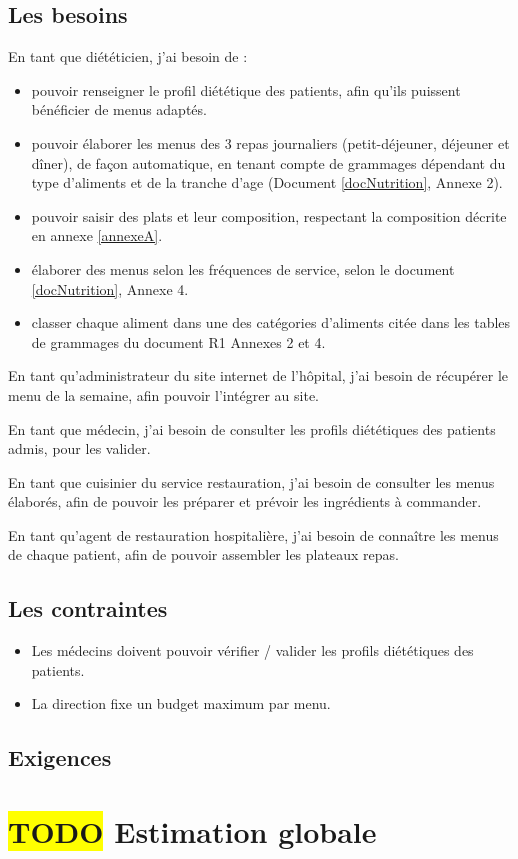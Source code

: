 \subsection{Les besoins}
En tant que diététicien, j’ai besoin de :
\begin{itemize}
 \item pouvoir renseigner le profil diététique des patients, afin qu’ils puissent bénéficier de menus adaptés.
 \item pouvoir élaborer les menus des 3 repas journaliers (petit-déjeuner, déjeuner et dîner), de façon automatique, en tenant compte de  grammages dépendant du type d'aliments et de la tranche d'age (Document \ref{docNutrition}, Annexe 2). 
 \item pouvoir saisir des plats et leur composition, respectant la composition décrite en annexe \ref{annexeA}.
 \item élaborer des menus selon les fréquences de service, selon le document \ref{docNutrition}, Annexe 4.
 \item classer chaque aliment dans une des catégories d’aliments citée dans les tables de grammages du document R1 Annexes 2 et 4.
\end{itemize}
En tant qu’administrateur du site internet de l’hôpital, j’ai besoin de récupérer le menu de la semaine, afin pouvoir l’intégrer au site.

En tant que médecin, j’ai besoin de consulter les profils diététiques des patients admis, pour les  valider.

En tant que cuisinier du service restauration, j’ai besoin de consulter les menus élaborés, afin de pouvoir les préparer et prévoir les ingrédients à commander.

En tant qu’agent de restauration hospitalière,  j’ai besoin de connaître les menus de chaque patient, afin de pouvoir assembler les plateaux repas.

\subsection{Les contraintes}
\begin{itemize}
\item Les médecins doivent pouvoir vérifier / valider les profils diététiques des patients.
\item La direction fixe un budget maximum par menu.
\end{itemize}

\subsection{Exigences}



\section{\colorbox{yellow}{TODO} Estimation globale}
